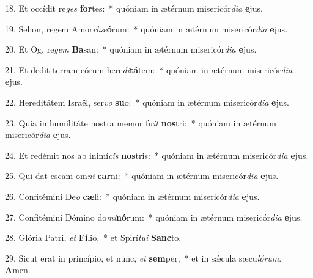 18. Et occídit re\textit{ges} \textbf{for}tes:~*  quóniam in ætérnum misericór\textit{di}\textit{a} \textbf{e}jus.\

19. Sehon, regem Amor\textit{rhæ}\textbf{ó}rum:~*  quóniam in ætérnum misericór\textit{di}\textit{a} \textbf{e}jus.\

20. Et Og, re\textit{gem} \textbf{Ba}san:~*  quóniam in ætérnum misericór\textit{di}\textit{a} \textbf{e}jus.\

21. Et dedit terram eórum here\textit{di}\textbf{tá}tem:~*  quóniam in ætérnum misericór\textit{di}\textit{a} \textbf{e}jus.\

22. Hereditátem Israël, ser\textit{vo} \textbf{su}o:~*  quóniam in ætérnum misericór\textit{di}\textit{a} \textbf{e}jus.\

23. Quia in humilitáte nostra memor fu\textit{it} \textbf{nos}tri:~*  quóniam in ætérnum misericór\textit{di}\textit{a} \textbf{e}jus.\

24. Et redémit nos ab inimí\textit{cis} \textbf{nos}tris:~*  quóniam in ætérnum misericór\textit{di}\textit{a} \textbf{e}jus.\

25. Qui dat escam om\textit{ni} \textbf{car}ni:~*  quóniam in ætérnum misericór\textit{di}\textit{a} \textbf{e}jus.\

26. Confitémini De\textit{o} \textbf{cæ}li:~*  quóniam in ætérnum misericór\textit{di}\textit{a} \textbf{e}jus.\

27. Confitémini Dómino do\textit{mi}\textbf{nó}rum:~*  quóniam in ætérnum misericór\textit{di}\textit{a} \textbf{e}jus.\

28. Glória Patri, \textit{et} \textbf{Fí}lio,~*  et Spirí\textit{tu}\textit{i} \textbf{Sanc}to.\

29. Sicut erat in princípio, et nunc, \textit{et} \textbf{sem}per,~*  et in sǽcula sæcu\textit{ló}\textit{rum}. \textbf{A}men.\

